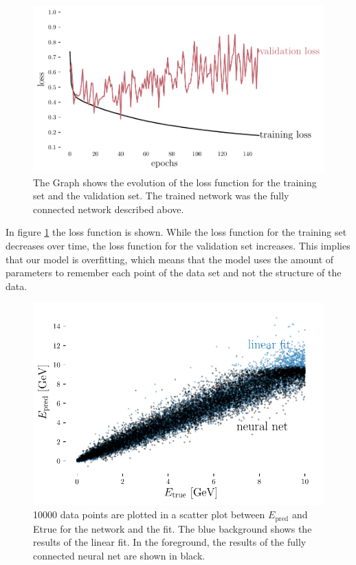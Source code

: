 \documentclass[12pt, a4paper]{thesis}
\begin{document}
\begin{figure}[H]
  \centering
  \includegraphics[width=.9\linewidth]{../images/dense_loss.pdf}
  \caption{The Graph shows the evolution of the loss function for the
    training set and the validation set. The trained network was the
    fully connected network described above.}
  \label{dense_loss}
\end{figure}


In figure \ref{dense_loss} the loss function is shown. While the loss
function for the training set decreases over time, the loss function
for the validation set increases. This implies that our model is
overfitting, which means that the model uses the amount of parameters
to remember each point of the data set and not the structure of the
data.

\begin{figure}[H]
  \centering
  \includegraphics[width=.9\linewidth]{../images/dense_scatter.pdf}
  \caption{ 10000 data points are plotted in a scatter plot between
    \(E_\text{pred}\) and Etrue for the network and the fit. The blue
    background shows the results of the linear fit. In the foreground,
    the results of the fully connected neural net are shown in black.}
  \label{dense_scatter}
\end{figure} 
\end{document}
